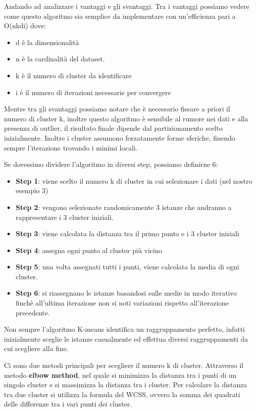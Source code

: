 \documentclass[a4paper]{extarticle}
\begin{document}
Andando ad analizzare i vantaggi e gli svantaggi. Tra i vantaggi possiamo vedere come questo algoritmo sia semplice da implementare con un'efficienza pari a O(nkdi) dove:

\begin{itemize}
\item d è la dimensionalità
\item n è la cardinalità del dataset.
\item k è il numero di cluster da identificare
\item i è il numero di iterazioni necessarie per convergere
\end{itemize}

Mentre tra gli svantaggi possiamo notare che è necessario fissare a priori il numero di cluster k, inoltre questo algoritmo è sensibile al rumore nei dati e alla presenza di outlier, il risultato finale dipende dal partizionamento scelto inizialmente. Inoltre i cluster assumono forzatamente forme sferiche, finendo sempre l'iterazione trovando i minimi locali.

Se dovessimo dividere l'algoritmo in diversi step, possiamo definirne 6:
\begin{itemize}
\item \textbf{Step 1}: viene scelto il numero k di cluster in cui selezionare i dati (nel nostro esempio 3)
\item \textbf{Step 2}: vengono selezionate randomicamente 3 istanze che andranno a rappresentare i 3 cluster iniziali.
\item \textbf{Step 3}: viene calcolata la distanza tra il primo punto e i 3 cluster iniziali
\item \textbf{Step 4}: assegna ogni punto al cluster più vicino
\item \textbf{Step 5}: una volta assegnati tutti i punti, viene calcolata la media di ogni cluster.
\item \textbf{Step 6}: si riassegnano le istanze basandosi sulle medie in modo iterativo finchè all'ultima iterazione non si noti variazioni rispetto all'iterazione precedente.
\end{itemize}

Non sempre l'algoritmo K-means identifica un raggruppamento perfetto, infatti inizialmente sceglie le istanze casualmente ed effettua diversi raggruppamenti da cui scegliere alla fine.

Ci sono due metodi principali per scegliere il numero k di cluster. Attraverso il metodo \textbf{elbow method}, nel quale si minimizza la distanza tra i punti di un singolo cluster e si massimizza la distanza tra i cluster. Per calcolare la distanza tra due cluster si utilizza la formula del WCSS, ovvero la somma dei quadrati delle differenze tra i vari punti dei cluster.
\end{document}
